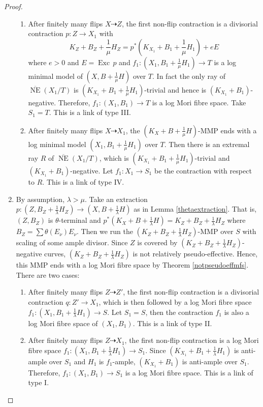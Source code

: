\documentclass[11pt]{amsart}
\begin{document}
\begin{proof}
\begin{enumerate}
\begin{enumerate}
      \item \label{a3}
            After finitely many flips $ X\dashrightarrow Z $, the first non-flip contraction is a divisorial contraction $ p:Z\to X_1$ with
            \[ K_Z+B_Z+\frac{1}{\mu}H_Z=p^*(K_{X_1}+B_1+\frac{1}{\mu}H_1)+eE \]
            where $ e>0 $ and  $E=\operatorname{Exc}\,p$ and  $f_{1}: (X_1,B_1+\frac{1}{\mu}H_1) \to T$ is a log minimal model of $(X,B+\frac{1}{\mu}H)$ over $T$. In fact the only ray of $ \overline{\operatorname{NE}}(X_1/T) $ is $ (K_{X_1}+B_1+\frac{1}{\mu}H_1) $-trivial and hence is $ (K_{X_1}+B_1) $-negative. Therefore, $ f_1:(X_1, B_1)\to T $ is a log Mori fibre space. Take $ S_1=T $. This is a link of type III.
      \item \label{a4}After finitely many flips $ X\dashrightarrow X_1 $, the $(K_{X}+B+\frac{1}{\mu}H)$-MMP ends with a log minimal model $ (X_1,B_1+\frac{1}{\mu}H_1) $ over $T $. Then there is an extremal ray $R$ of $ \overline{\operatorname{NE}}(X_1/T) $, which is $ (K_{X_1}+B_1+\frac{1}{\mu}H_1) $-trivial and $ (K_{X_1}+B_1) $-negative. Let $ f_1:X_1\to S_1 $ be the contraction with respect to $R$. This is a link of type IV.
    \end{enumerate}
    \item\label{b}By assumption, $\lambda>\mu$. Take  an extraction $ p:(Z,B_Z+\frac{1}{\lambda}H_Z)\to (X,B+\frac{1}{\lambda}H) $ as in Lemma \ref{thetaextraction}. That is,  $ (Z,B_Z) $ is $ \theta $-terminal and $ p^*(K_X+B+\frac{1}{\lambda}H)=K_Z+B_Z+\frac{1}{\lambda}H_Z $ where $ B_Z=\sum\theta(E_\nu)E_\nu $.
    Then we run the $ (K_Z+B_Z+\frac{1}{\lambda}H_Z) $-MMP over $ S $ with scaling of some ample divisor. Since $Z$ is covered by $ (K_Z+B_Z+\frac{1}{\lambda}H_Z) $-negative curves, $ (K_Z+B_Z+\frac{1}{\lambda}H_Z) $ is not relatively pseudo-effective. Hence, this MMP ends with a log Mori fibre space by Theorem \ref{notpseudoeffmfs}. There are two cases:
    \begin{enumerate}
      \item \label{b1}After finitely many flips $ Z\dashrightarrow Z' $, the first non-flip contraction is a divisorial contraction $ q:Z'\to X_1 $, which is then followed by a log Mori fibre space   $f_1:(X_1,B_1+\frac{1}{\lambda}H_1)\to S$. Let $ S_1=S $, then the contraction  $f_1$ is also a log Mori fibre space of $(X_1, B_1)$. This is a link of type II.
            \item\label{b2}After finitely many flips $ Z\dashrightarrow X_1 $, the first non-flip contraction is a log Mori fibre space  $f_1:(X_1,B_1+\frac{1}{\lambda}H_1)\to S_1$. Since $ (K_{X_1}+B_1+\frac{1}{\lambda}H_1) $ is anti-ample over $S_1$ and $ H_1 $ is $ f_1 $-ample, $(K_{X_1}+B_1) $ is anti-ample over $S_1$. Therefore, $ f_1:(X_1, B_1)\to S_1 $ is a log Mori fibre space. This is a link of type I.
    \end{enumerate}
  \end{enumerate}
\end{proof}
\end{document}
